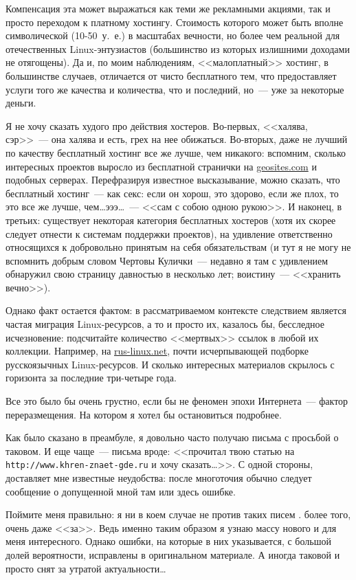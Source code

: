 Компенсация эта может выражаться как теми же рекламными акциями, так и просто переходом к платному хостингу. Стоимость которого может быть вполне символической (10-50~у.~е.) в масштабах вечности, но более чем реальной для отечественных Linux-энтузиастов (большинство из которых излишними доходами не отягощены). Да и, по моим наблюдениям, <<малоплатный>> хостинг, в большинстве случаев, отличается от чисто бесплатного тем, что предоставляет услуги того же качества и количества, что и последний, но~--- уже за некоторые деньги. 

Я не хочу сказать худого про действия хостеров. Во-первых, <<халява, сэр>>~--- она халява и есть, грех на нее обижаться. Во-вторых, даже не лучший по качеству бесплатный хостинг все же лучше, чем никакого: вспомним, сколько интересных проектов выросло из бесплатной странички на \url{geosites.com} и подобных серверах. Перефразируя известное высказывание, можно сказать, что бесплатный хостинг~--- как секс: если он хорош, это здорово, если же плох, то это все же лучше, чем\dots эээ\dots~--- <<сам с собою одною рукою>>. И наконец, в третьих: существует некоторая категория бесплатных хостеров (хотя их скорее следует отнести к системам поддержки проектов), на удивление ответственно относящихся к добровольно принятым на себя обязательствам (и тут я не могу не вспомнить добрым словом Чертовы Кулички~--- недавно я там с удивлением обнаружил свою страницу давностью в несколько лет; воистину~--- <<хранить вечно>>). 

Однако факт остается фактом: в рассматриваемом контексте следствием является частая миграция Linux-ресурсов, а то и просто их, казалось бы, бесследное исчезновение: подсчитайте количество <<мертвых>> ссылок в любой их коллекции. Например, на \url{rus-linux.net}, почти исчерпывающей подборке русскоязычных Linux-ресурсов. И сколько интересных материалов скрылось с горизонта за последние три-четыре года. 

Все это было бы очень грустно, если бы не феномен эпохи Интернета~--- фактор переразмещения. На котором я хотел бы остановиться подробнее. 

Как было сказано в преамбуле, я довольно часто получаю письма с просьбой о таковом. И еще чаще~--- письма вроде: <<прочитал твою статью на \texttt{http://www.khren-znaet-gde.ru} и хочу сказать\dots>>. С одной стороны, доставляет мне известные неудобства: после многоточия обычно следует сообщение о допущенной мной там или здесь ошибке. 

Поймите меня правильно: я ни в коем случае не против таких писем . более того, очень даже <<за>>. Ведь именно таким образом я узнаю массу нового и для меня интересного. Однако ошибки, на которые в них указывается, с большой долей вероятности, исправлены в оригинальном материале. А иногда таковой и просто снят за утратой актуальности\dots 

